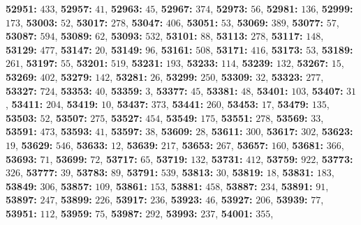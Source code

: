 \textsf{\bfseries 52951:} $433$, \textsf{\bfseries 52957:} $41$, \textsf{\bfseries 52963:} $45$, \textsf{\bfseries 52967:} $374$, \textsf{\bfseries 52973:} $56$, \textsf{\bfseries 52981:} $136$, \textsf{\bfseries 52999:} $173$, \textsf{\bfseries 53003:} $52$, \textsf{\bfseries 53017:} $278$, \textsf{\bfseries 53047:} $406$, \textsf{\bfseries 53051:} $53$, \textsf{\bfseries 53069:} $389$, \textsf{\bfseries 53077:} $57$, \textsf{\bfseries 53087:} $594$, \textsf{\bfseries 53089:} $62$, \textsf{\bfseries 53093:} $532$, \textsf{\bfseries 53101:} $88$, \textsf{\bfseries 53113:} $278$, \textsf{\bfseries 53117:} $148$, \textsf{\bfseries 53129:} $477$, \textsf{\bfseries 53147:} $20$, \textsf{\bfseries 53149:} $96$, \textsf{\bfseries 53161:} $508$, \textsf{\bfseries 53171:} $416$, \textsf{\bfseries 53173:} $53$, \textsf{\bfseries 53189:} $261$, \textsf{\bfseries 53197:} $55$, \textsf{\bfseries 53201:} $519$, \textsf{\bfseries 53231:} $193$, \textsf{\bfseries 53233:} $114$, \textsf{\bfseries 53239:} $132$, \textsf{\bfseries 53267:} $15$, \textsf{\bfseries 53269:} $402$, \textsf{\bfseries 53279:} $142$, \textsf{\bfseries 53281:} $26$, \textsf{\bfseries 53299:} $250$, \textsf{\bfseries 53309:} $32$, \textsf{\bfseries 53323:} $277$, \textsf{\bfseries 53327:} $724$, \textsf{\bfseries 53353:} $40$, \textsf{\bfseries 53359:} $3$, \textsf{\bfseries 53377:} $45$, \textsf{\bfseries 53381:} $48$, \textsf{\bfseries 53401:} $103$, \textsf{\bfseries 53407:} $31$, \textsf{\bfseries 53411:} $204$, \textsf{\bfseries 53419:} $10$, \textsf{\bfseries 53437:} $373$, \textsf{\bfseries 53441:} $260$, \textsf{\bfseries 53453:} $17$, \textsf{\bfseries 53479:} $135$, \textsf{\bfseries 53503:} $52$, \textsf{\bfseries 53507:} $275$, \textsf{\bfseries 53527:} $454$, \textsf{\bfseries 53549:} $175$, \textsf{\bfseries 53551:} $278$, \textsf{\bfseries 53569:} $33$, \textsf{\bfseries 53591:} $473$, \textsf{\bfseries 53593:} $41$, \textsf{\bfseries 53597:} $38$, \textsf{\bfseries 53609:} $28$, \textsf{\bfseries 53611:} $300$, \textsf{\bfseries 53617:} $302$, \textsf{\bfseries 53623:} $19$, \textsf{\bfseries 53629:} $546$, \textsf{\bfseries 53633:} $12$, \textsf{\bfseries 53639:} $217$, \textsf{\bfseries 53653:} $267$, \textsf{\bfseries 53657:} $160$, \textsf{\bfseries 53681:} $366$, \textsf{\bfseries 53693:} $71$, \textsf{\bfseries 53699:} $72$, \textsf{\bfseries 53717:} $65$, \textsf{\bfseries 53719:} $132$, \textsf{\bfseries 53731:} $412$, \textsf{\bfseries 53759:} $922$, \textsf{\bfseries 53773:} $326$, \textsf{\bfseries 53777:} $39$, \textsf{\bfseries 53783:} $89$, \textsf{\bfseries 53791:} $539$, \textsf{\bfseries 53813:} $30$, \textsf{\bfseries 53819:} $18$, \textsf{\bfseries 53831:} $183$, \textsf{\bfseries 53849:} $306$, \textsf{\bfseries 53857:} $109$, \textsf{\bfseries 53861:} $153$, \textsf{\bfseries 53881:} $458$, \textsf{\bfseries 53887:} $234$, \textsf{\bfseries 53891:} $91$, \textsf{\bfseries 53897:} $247$, \textsf{\bfseries 53899:} $226$, \textsf{\bfseries 53917:} $236$, \textsf{\bfseries 53923:} $46$, \textsf{\bfseries 53927:} $206$, \textsf{\bfseries 53939:} $77$, \textsf{\bfseries 53951:} $112$, \textsf{\bfseries 53959:} $75$, \textsf{\bfseries 53987:} $292$, \textsf{\bfseries 53993:} $237$, \textsf{\bfseries 54001:} $355$, 
